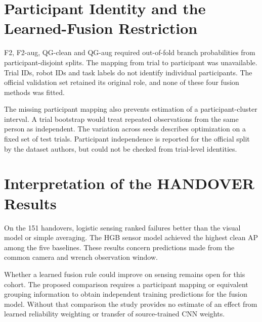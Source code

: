 \section{Participant Identity and the Learned-Fusion Restriction}
F2, F2-aug, QG-clean and QG-aug required out-of-fold branch probabilities from participant-disjoint splits. The mapping from trial to participant was unavailable. Trial IDs, robot IDs and task labels do not identify individual participants. The official validation set retained its original role, and none of these four fusion methods was fitted.

The missing participant mapping also prevents estimation of a participant-cluster interval. A trial bootstrap would treat repeated observations from the same person as independent. The variation across seeds describes optimization on a fixed set of test trials. Participant independence is reported for the official split by the dataset authors, but could not be checked from trial-level identities.

\section{Interpretation of the HANDOVER Results}
On the 151 handovers, logistic sensing ranked failures better than the visual model or simple averaging. The HGB sensor model achieved the highest clean AP among the five baselines. These results concern predictions made from the common camera and wrench observation window.

Whether a learned fusion rule could improve on sensing remains open for this cohort. The proposed comparison requires a participant mapping or equivalent grouping information to obtain independent training predictions for the fusion model. Without that comparison the study provides no estimate of an effect from learned reliability weighting or transfer of source-trained CNN weights.
